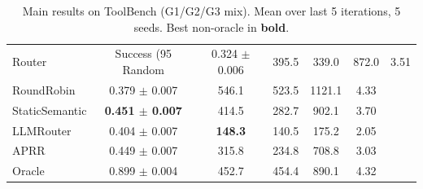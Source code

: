 \begin{table}[t]
\centering
\caption{Main results on ToolBench (G1/G2/G3 mix). Mean over last 5 iterations, 5 seeds. Best non-oracle in \textbf{bold}.}
\label{tab:main}
\begin{tabular}{lccccc}
\toprule
Router & Success (95%
\midrule
Random & 0.324 $\pm$ 0.006 & 395.5 & 339.0 & 872.0 & 3.51 \\
RoundRobin & 0.379 $\pm$ 0.007 & 546.1 & 523.5 & 1121.1 & 4.33 \\
StaticSemantic & \textbf{0.451 $\pm$ 0.007} & 414.5 & 282.7 & 902.1 & 3.70 \\
LLMRouter & 0.404 $\pm$ 0.007 & \textbf{148.3} & 140.5 & 175.2 & 2.05 \\
APRR & 0.449 $\pm$ 0.007 & 315.8 & 234.8 & 708.8 & 3.03 \\
Oracle & 0.899 $\pm$ 0.004 & 452.7 & 454.4 & 890.1 & 4.32 \\
\bottomrule
\end{tabular}
\end{table}